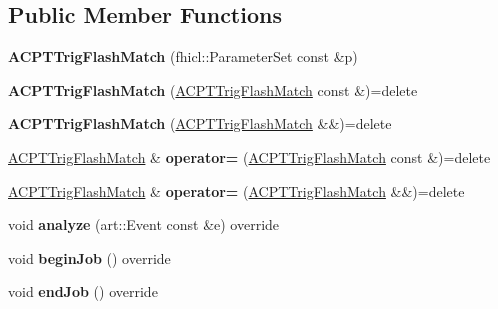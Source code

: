 \subsection*{Public Member Functions}
\begin{DoxyCompactItemize}
\item 
{\bfseries A\+C\+P\+T\+Trig\+Flash\+Match} (fhicl\+::\+Parameter\+Set const \&p)\hypertarget{classACPTTrigFlashMatch_a023bad289ce905162bf51061a9ea8a57}{}\label{classACPTTrigFlashMatch_a023bad289ce905162bf51061a9ea8a57}

\item 
{\bfseries A\+C\+P\+T\+Trig\+Flash\+Match} (\hyperlink{classACPTTrigFlashMatch}{A\+C\+P\+T\+Trig\+Flash\+Match} const \&)=delete\hypertarget{classACPTTrigFlashMatch_a7163ff6a902f715eb65241e9ef29a5d7}{}\label{classACPTTrigFlashMatch_a7163ff6a902f715eb65241e9ef29a5d7}

\item 
{\bfseries A\+C\+P\+T\+Trig\+Flash\+Match} (\hyperlink{classACPTTrigFlashMatch}{A\+C\+P\+T\+Trig\+Flash\+Match} \&\&)=delete\hypertarget{classACPTTrigFlashMatch_a4076bcb46f4d41fa115392321797bc9f}{}\label{classACPTTrigFlashMatch_a4076bcb46f4d41fa115392321797bc9f}

\item 
\hyperlink{classACPTTrigFlashMatch}{A\+C\+P\+T\+Trig\+Flash\+Match} \& {\bfseries operator=} (\hyperlink{classACPTTrigFlashMatch}{A\+C\+P\+T\+Trig\+Flash\+Match} const \&)=delete\hypertarget{classACPTTrigFlashMatch_a838017cf67fc68be164910cc77a0cc74}{}\label{classACPTTrigFlashMatch_a838017cf67fc68be164910cc77a0cc74}

\item 
\hyperlink{classACPTTrigFlashMatch}{A\+C\+P\+T\+Trig\+Flash\+Match} \& {\bfseries operator=} (\hyperlink{classACPTTrigFlashMatch}{A\+C\+P\+T\+Trig\+Flash\+Match} \&\&)=delete\hypertarget{classACPTTrigFlashMatch_a157f0419b2b3a93cf06551989e694b4d}{}\label{classACPTTrigFlashMatch_a157f0419b2b3a93cf06551989e694b4d}

\item 
void {\bfseries analyze} (art\+::\+Event const \&e) override\hypertarget{classACPTTrigFlashMatch_ac752939160dfab34cdd0741a7f715eec}{}\label{classACPTTrigFlashMatch_ac752939160dfab34cdd0741a7f715eec}

\item 
void {\bfseries begin\+Job} () override\hypertarget{classACPTTrigFlashMatch_ab182358806d46b65d6836573eb4f957d}{}\label{classACPTTrigFlashMatch_ab182358806d46b65d6836573eb4f957d}

\item 
void {\bfseries end\+Job} () override\hypertarget{classACPTTrigFlashMatch_ae186ed9ccbcbdab43ee65cc856a75c87}{}\label{classACPTTrigFlashMatch_ae186ed9ccbcbdab43ee65cc856a75c87}

\end{DoxyCompactItemize}
